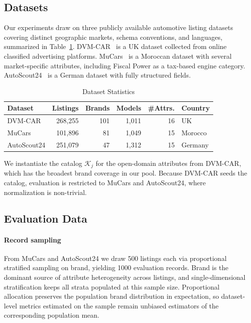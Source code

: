 \documentclass[conference]{IEEEtran}
\begin{document}
\subsection{Datasets}

Our experiments draw on three publicly available automotive listing datasets
covering distinct geographic markets, schema conventions, and languages,
summarized in Table~\ref{tab:datasets}. DVM-CAR~\cite{10020634} is a UK
dataset collected from online classified advertising platforms.
MuCars~\cite{tabarnoust2025mucars, tabarnoust2024mucars} is a Moroccan dataset with several
market-specific attributes, including Fiscal Power as a tax-based engine
category. AutoScout24~\cite{wspirat2023autoscout24} is a German dataset
with fully structured fields.

\begin{table}[htbp]
\caption{Dataset Statistics}
\begin{center}
\begin{tabular}{|l|r|r|r|r|l|}
\hline
\textbf{Dataset} & \textbf{Listings} & \textbf{Brands} & \textbf{Models} & \textbf{\#Attrs.} & \textbf{Country} \\
\hline
DVM-CAR     & 268,255 & 101 & 1,011  & 16 & UK \\
MuCars      & 101,896 & 81  & 1,049  & 15 & Morocco \\
AutoScout24 & 251,079 & 47  & 1,312  & 15 & Germany \\
\hline
\end{tabular}
\label{tab:datasets}
\end{center}
\end{table}

We instantiate the catalog $\mathcal{K}_j$ for the open-domain
attributes from DVM-CAR, which has the broadest brand coverage in our pool.
Because DVM-CAR seeds the catalog, evaluation is restricted to MuCars and AutoScout24, where
normalization is non-trivial.

\subsection{Evaluation Data}

\paragraph{Record sampling}
From MuCars and AutoScout24 we draw 500 listings each via
proportional stratified sampling on brand, yielding 1000 evaluation
records. Brand is the dominant source of attribute heterogeneity
across listings, and single-dimensional stratification keeps all
strata populated at this sample size. Proportional allocation
preserves the population brand distribution in expectation, so
dataset-level metrics estimated on the sample remain unbiased
estimators of the corresponding population mean.
\end{document}
